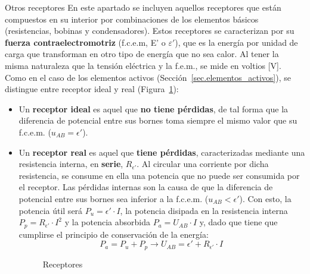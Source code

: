 \documentclass[11pt]{book} %
\makeatletter
\numberwithin{dummy}{section}
\theoremstyle{ocrenumbox}
\theoremstyle{blacknumex}
\theoremstyle{blacknumbox}
\theoremstyle{ocrenum}
\renewcommand{\subsubsection}{\@startsection {subsubsection}{3}{\z@}
{-2ex \@plus -0.1ex \@minus -.2ex}
{.2ex \@plus.2ex }
{\normalfont\small\sffamily\bfseries}}
\makeatother
\begin{document}
	\subsubsection{Otros receptores}
	En este apartado se incluyen aquellos receptores que están compuestos en su interior por combinaciones de los elementos básicos (resistencias, bobinas y condensadores). Estos receptores se caracterizan por su \textbf{fuerza contraelectromotriz} (f.c.e.m, E' o $\varepsilon'$), que es la energía por unidad de carga que transforman en otro tipo de energía que no sea calor. Al tener la misma naturaleza que la tensión eléctrica y la f.e.m., se mide en voltios [V]. Como en el caso de los elementos activos (Sección~\ref{sec.elementos_activos}), se distingue entre receptor ideal y real (Figura~\ref{fig.receptores}):
	\begin{itemize}
		\item Un \textbf{receptor ideal} es aquel que \textbf{no tiene pérdidas}, de tal forma que la diferencia de potencial entre sus bornes toma siempre el mismo valor que su f.c.e.m. ($u_{AB}=\epsilon'$).
		\item Un \textbf{receptor real} es aquel que \textbf{tiene pérdidas}, caracterizadas mediante una resistencia interna, en \textbf{serie}, $R_{\epsilon'}$. Al circular una corriente por dicha resistencia, se consume en ella una potencia que no puede ser consumida por el receptor. Las pérdidas internas son la causa de que la diferencia de potencial entre sus bornes sea inferior a la f.c.e.m. ($u_{AB}<\epsilon'$). Con esto, la potencia útil será $P_u=\epsilon'\cdot I$, la potencia disipada en la resistencia interna $P_p=R_{\epsilon'}\cdot I^2$ y la potencia absorbida $P_a=U_{AB}\cdot I$ y, dado que tiene que cumplirse el principio de conservación de la energía:
		\begin{equation}
			P_a=P_u+P_p\rightarrow \boxed{U_{AB}=\epsilon'+ R_{\epsilon'}\cdot I}\,
		\end{equation}
		\begin{figure}[htbp]
			\centering
			\hfil
			\caption{Receptores}
			\label{fig.receptores}
		\end{figure}
	\end{itemize}
	
\end{document}
